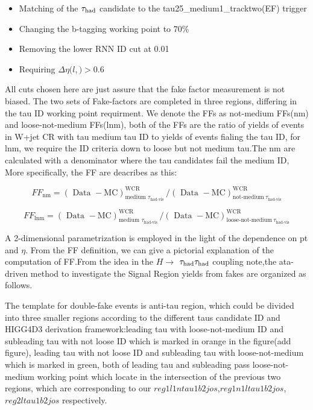\begin{itemize}
\item    Matching of the $\tau_\text{had}$ candidate to the tau25\_medium1\_tracktwo(EF) trigger

\item    Changing the b-tagging working point to 70\%

\item    Removing the lower RNN ID cut at 0.01

\item    Requiring $\Delta\eta (l,$\tauhad$)>0.6$
\end{itemize}

All cuts chosen here are just assure that the fake factor measurement is not biased. The two sets of Fake-factors are completed in three regions, differing in the tau ID working point requirment. We denote the FFs as not-medium FFs(nm) and loose-not-medium FFs(lnm), both of the FFs are the ratio of yields of events in W+jet CR with tau medium tau ID to yields of events fialing the tau ID, for lnm, we require the ID criteria down to loose but not medium tau.The nm are calculated with a denominator where the tau candidates fail the medium ID, More specifically, the FF are deacribes as this: 

\begin{equation}
F F_{\mathrm{nm}}=(\text { Data }-\mathrm{MC})_{\text {medium } \tau_{\text {had-vis }}}^{\mathrm{WCR}} /(\text { Data }-\mathrm{MC})_{\text {not-medium}\ \tau_{\text{had-vis}}}^{\mathrm{WCR}} 
\end{equation}

\begin{equation}
F F_{\mathrm{lnm}}=(\text { Data }-\mathrm{MC})_{\text {medium } \tau_{\text {had-vis }}}^{\mathrm{WCR}} /(\text { Data }-\mathrm{MC})_{\text {loose-not-medium}\ \tau_{\text{had-vis}}}^{\mathrm{WCR}}
\end{equation}

A 2-dimensional parametrization is employed in the light of the dependence on pt and $\eta$. From the FF definition, we can give a pictorial explanation of the computation of FF.From the idea in the $H\rightarrow$ $\tau_\text{had}{}\tau_\text{had}$ coupling note,the ata-driven method to investigate the Signal Region yields from fakes are organized as follows.

The template for double-fake events is anti-tau region, which could be divided into three smaller regions according to the different taus candidate ID and HIGG4D3 derivation framework:leading tau with loose-not-medium ID and subleading tau with not loose ID which is marked in orange in the figure(add figure), leading tau with not loose ID and subleading tau with loose-not-medium which is marked in green, both of leading tau and subleading pass loose-not-medium working point which locate in the intersection of the previous two regions, which are corresponding to our $reg1l1ntau1b2jos$,$reg1n1ltau1b2jos$,$reg2ltau1b2jos$ respectively.

